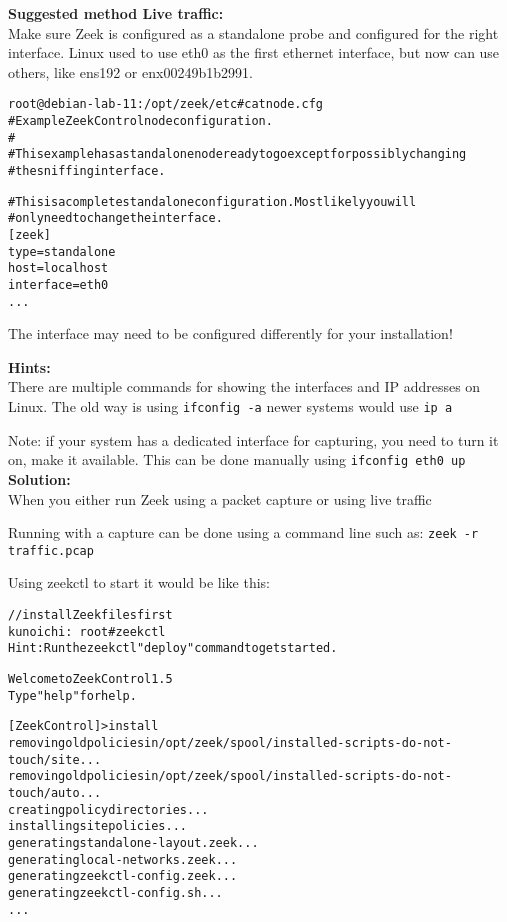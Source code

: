 \documentclass[a4paper,11pt,notitlepage]{report}
\begin{document}
{\bf Suggested method Live traffic:}\\
Make sure Zeek is configured as a standalone probe and configured for the right interface. Linux used to use eth0 as the first ethernet interface, but now can use others, like ens192 or enx00249b1b2991.

\begin{alltt}
root@debian-lab-11:/opt/zeek/etc# cat node.cfg
# Example ZeekControl node configuration.
#
# This example has a standalone node ready to go except for possibly changing
# the sniffing interface.

# This is a complete standalone configuration.  Most likely you will
# only need to change the interface.
[zeek]
type=standalone
host=localhost
interface=eth0
...
\end{alltt}

The interface may need to be configured differently for your installation!

{\bf Hints:}\\
There are multiple commands for showing the interfaces and IP addresses on Linux. The old way is using \verb+ifconfig -a+ newer systems would use \verb+ip a+

Note: if your system has a dedicated interface for capturing, you need to turn it on, make it available. This can be done manually using \verb+ifconfig eth0 up+
{\bf Solution:}\\
When you either run Zeek using a packet capture or using live traffic

Running with a capture can be done using a command line such as:
\verb+zeek -r traffic.pcap+

Using zeekctl to start it would be like this:
\begin{alltt}\small
// install Zeek files first
kunoichi:~ root# zeekctl
Hint: Run the zeekctl "deploy" command to get started.

Welcome to ZeekControl 1.5
Type "help" for help.

[ZeekControl] > install
removing old policies in /opt/zeek/spool/installed-scripts-do-not-touch/site ...
removing old policies in /opt/zeek/spool/installed-scripts-do-not-touch/auto ...
creating policy directories ...
installing site policies ...
generating standalone-layout.zeek ...
generating local-networks.zeek ...
generating zeekctl-config.zeek ...
generating zeekctl-config.sh ...
...
\end{alltt}
\end{document}
